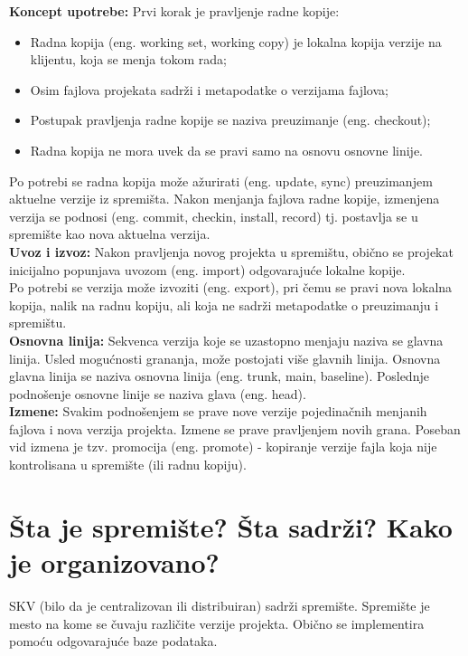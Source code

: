 \documentclass[a4paper]{article}
\begin{document}
  \textbf{Koncept upotrebe:} Prvi korak je pravljenje radne kopije:
  \begin{itemize}
    \item Radna kopija (eng. working set, working copy) je lokalna kopija verzije na klijentu, 
          koja se menja tokom rada;
    \item Osim fajlova projekata sadrži i metapodatke o verzijama fajlova;
    \item Postupak pravljenja radne kopije se naziva preuzimanje (eng. checkout);
    \item Radna kopija ne mora uvek da se pravi samo na osnovu osnovne linije.
  \end{itemize}
  Po potrebi se radna kopija može ažurirati (eng. update, sync) preuzimanjem aktuelne verzije 
  iz spremišta. Nakon menjanja fajlova radne kopije, izmenjena verzija se podnosi 
  (eng. commit, checkin, install, record) tj. postavlja se u spremište kao nova aktuelna verzija.\\
  
  \textbf{Uvoz i izvoz:} Nakon pravljenja novog projekta u spremištu, obično se projekat inicijalno 
  popunjava uvozom (eng. import) odgovarajuće lokalne kopije.\\
  \indent Po potrebi se verzija može izvoziti (eng. export), pri čemu se pravi nova lokalna kopija, 
  nalik na radnu kopiju, ali koja ne sadrži metapodatke o preuzimanju i spremištu.\\
  
  \textbf{Osnovna linija:} Sekvenca verzija koje se uzastopno menjaju naziva se glavna linija. 
  Usled mogućnosti grananja, može postojati više glavnih linija. Osnovna glavna linija se naziva 
  osnovna linija (eng. trunk, main, baseline). Poslednje podnošenje osnovne linije se naziva 
  glava (eng. head).\\
  
  \textbf{Izmene:} Svakim podnošenjem se prave nove verzije pojedinačnih menjanih fajlova i 
  nova verzija projekta. Izmene se prave pravljenjem novih grana. Poseban vid izmena je tzv. 
  promocija (eng. promote) - kopiranje verzije fajla koja nije kontrolisana u spremište 
  (ili radnu kopiju).
   
\section{Šta je spremište? Šta sadrži? Kako je organizovano?}
  SKV (bilo da je centralizovan ili distribuiran) sadrži spremište. 
  Spremište je mesto na kome se čuvaju različite verzije projekta. 
  Obično se implementira pomoću odgovarajuće baze podataka.
\end{document}
